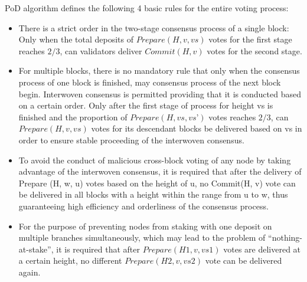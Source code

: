 PoD algorithm defines the following 4 basic rules for the entire voting process:

\begin{itemize}
\item There is a strict order in the two-stage consensus process of a single block: Only when the total deposits of $Prepare(H, v, vs)$ votes for the first stage reaches $2/3$, can validators deliver $Commit(H, v)$ votes for the second stage.

\item For multiple blocks, there is no mandatory rule that only when the consensus process of one block is finished, may consensus process of the next block begin. Interwoven consensus is permitted providing that it is conducted based on a certain order. Only after the first stage of process for height vs is finished and the proportion of $Prepare(H, vs, vs’)$ votes reaches $2/3$, can $Prepare(H, v, vs)$ votes for its descendant blocks be delivered based on vs in order to ensure stable proceeding of the interwoven consensus.

\item To avoid the conduct of malicious cross-block voting of any node by taking advantage of the interwoven consensus, it is required that after the delivery of Prepare (H, w, u) votes based on the height of u, no Commit(H, v) vote can be delivered in all blocks with a height within the range from u to w, thus guaranteeing high efficiency and orderliness of the consensus process.

\item For the purpose of preventing nodes from staking with one deposit on multiple branches simultaneously, which may lead to the problem of “nothing-at-stake”, it is required that after $Prepare(H1, v, vs1)$ votes are delivered at a certain height, no different $Prepare(H2, v, vs2)$ vote can be delivered again.
\end{itemize}

